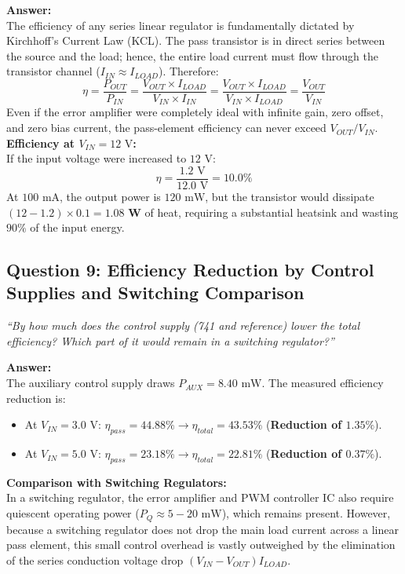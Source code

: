 \documentclass[11pt,a4paper]{article}
\begin{document}
\textbf{Answer:}\\
The efficiency of any series linear regulator is fundamentally dictated by Kirchhoff's Current Law (KCL). The pass transistor is in direct series between the source and the load; hence, the entire load current must flow through the transistor channel ($I_{IN} \approx I_{LOAD}$). Therefore:
\begin{equation}
    \eta = \frac{P_{OUT}}{P_{IN}} = \frac{V_{OUT} \times I_{LOAD}}{V_{IN} \times I_{IN}} = \frac{V_{OUT} \times I_{LOAD}}{V_{IN} \times I_{LOAD}} = \frac{V_{OUT}}{V_{IN}}
\end{equation}
Even if the error amplifier were completely ideal with infinite gain, zero offset, and zero bias current, the pass-element efficiency can never exceed $V_{OUT} / V_{IN}$.\\
\textbf{Efficiency at $V_{IN} = 12\text{ V}$:}\\
If the input voltage were increased to $12\text{ V}$:
\begin{equation}
    \eta = \frac{1.2\text{ V}}{12.0\text{ V}} = \mathbf{10.0\%}
\end{equation}
At $100\text{ mA}$, the output power is $120\text{ mW}$, but the transistor would dissipate $(12 - 1.2) \times 0.1 = \mathbf{1.08\text{ W}}$ of heat, requiring a substantial heatsink and wasting $90\%$ of the input energy.

\subsection{Question 9: Efficiency Reduction by Control Supplies and Switching Comparison}
\textit{``By how much does the control supply (741 and reference) lower the total efficiency? Which part of it would remain in a switching regulator?''}

\textbf{Answer:}\\
The auxiliary control supply draws $P_{AUX} = 8.40\text{ mW}$. The measured efficiency reduction is:
\begin{itemize}
    \item At $V_{IN} = 3.0\text{ V}$: $\eta_{pass} = 44.88\% \to \eta_{total} = 43.53\%$ (\textbf{Reduction of $1.35\%$}).
    \item At $V_{IN} = 5.0\text{ V}$: $\eta_{pass} = 23.18\% \to \eta_{total} = 22.81\%$ (\textbf{Reduction of $0.37\%$}).
\end{itemize}
\textbf{Comparison with Switching Regulators:}\\
In a switching regulator, the error amplifier and PWM controller IC also require quiescent operating power ($P_Q \approx 5 - 20\text{ mW}$), which remains present. However, because a switching regulator does not drop the main load current across a linear pass element, this small control overhead is vastly outweighed by the elimination of the series conduction voltage drop $(V_{IN} - V_{OUT})I_{LOAD}$.
\end{document}
